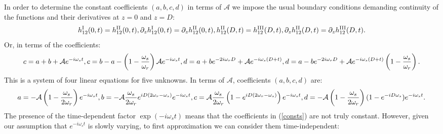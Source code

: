 \documentclass[12pt]{article}
\def\\{\hfill\break} \let\==\equiv
\begin{document}
In order to determine the constant coefficients $(a,b,c,d)$ in terms of $\mathcal{A}$ we impose the usual boundary conditions demanding continuity of the functions and their derivatives at $z = 0$ and $z=D$: 
\begin{equation}\label{boundary}
    \begin{split}
        h_{12}^{\text{I}}(0,t) = h_{12}^{\text{II}}(0,t), \\
        \partial_z h_{12}^{\text{I}}(0,t) = \partial_z h_{12}^{\text{II}}(0,t), \\
        h_{12}^{\text{II}}(D,t) = h_{12}^{\text{III}}(D,t), \\
        \partial_z h_{12}^{\text{II}}(D,t) = \partial_z h_{12}^{\text{III}}(D,t).
    \end{split}
\end{equation}
Or, in terms of the coefficients:
\begin{equation}\label{boundary2}
    \begin{split}
    c = a + b + \mathcal{A} e^{-i\omega_st}, \\
    c = b - a - \left(1-\frac{\omega_s}{\omega_r}\right)\mathcal{A} e^{-i\omega_s t},\\
    d = a + b e^{-2i\omega_rD} + \mathcal{A} e^{-i\omega_s(D+t)}, \\
    d = a - b e^{-2i\omega_rD} + \mathcal{A} e^{-i\omega_s(D+t)} \left(1-\frac{\omega_s}{\omega_r}\right).
    \end{split}
\end{equation}
This is a system of four linear equations for five unknowns. In terms of $\mathcal{A}$, coefficients $(a,b,c,d)$ are:
\begin{equation}\label{consts}
    \begin{split}
        a = - \mathcal{A} \left(1-\frac{\omega_s}{2 \omega_r}\right) e^{-i \omega_s t},\\
        b = - \mathcal{A} \frac{\omega_s}{2 \omega_r} e^{iD(2\omega_r - \omega_s)} e^{- i \omega_s t}, \\
        c = \mathcal{A} \frac{\omega_s}{2\omega_r}\left(1-e^{iD(2\omega_r-\omega_s)}\right)e^{-i\omega_s t}, \\
        d = - \mathcal{A} \left(1 - \frac{\omega_s}{2\omega_r}\right)(1-e^{-iD\omega_s})e^{-i\omega_st}.
    \end{split}
\end{equation}
The presence of the time-dependent factor $\exp(-i\omega_st)$ means that the coefficients in (\ref{consts}) are not truly constant. However, given our assumption that $e^{-i\omega_s t}$ is slowly varying, to first approximation we can consider them time-independent:
\end{document}
